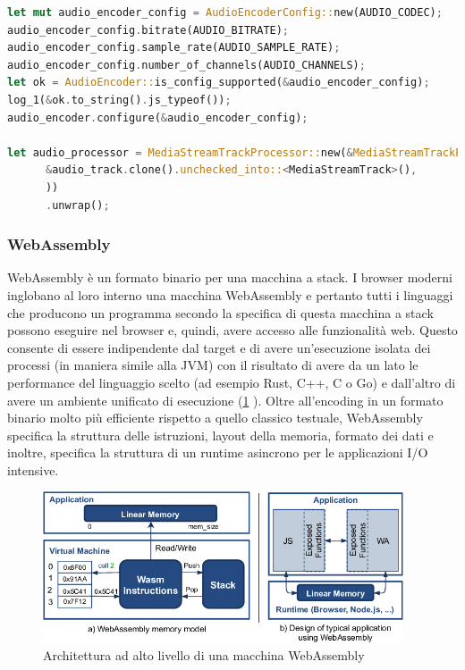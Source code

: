 \documentclass{article}
\begin{document}
\begin{lstlisting}[language=Rust, style=boxed, label={lst:audio-encoder-example}, captionpos=b,caption={Accesso e configurazione di AudioEncoder}]
let mut audio_encoder_config = AudioEncoderConfig::new(AUDIO_CODEC);
audio_encoder_config.bitrate(AUDIO_BITRATE);
audio_encoder_config.sample_rate(AUDIO_SAMPLE_RATE);
audio_encoder_config.number_of_channels(AUDIO_CHANNELS);
let ok = AudioEncoder::is_config_supported(&audio_encoder_config);
log_1(&ok.to_string().js_typeof());
audio_encoder.configure(&audio_encoder_config);

let audio_processor = MediaStreamTrackProcessor::new(&MediaStreamTrackProcessorInit::new(
      &audio_track.clone().unchecked_into::<MediaStreamTrack>(),
      ))
      .unwrap();

\end{lstlisting}
\subsubsection{WebAssembly} \label{section:web-assembly}
WebAssembly \cite{rossberg2021webassembly} è un formato binario per una macchina a stack. I browser moderni inglobano al 
loro interno una macchina WebAssembly e pertanto tutti i linguaggi che producono un programma
secondo la specifica di questa macchina a stack possono eseguire nel browser e, quindi, avere
accesso alle funzionalità web. Questo consente di essere indipendente dal target e di avere 
un'esecuzione isolata dei processi (in maniera simile alla JVM) con il risultato di avere 
da un lato le performance del linguaggio scelto (ad esempio Rust, C++, C o Go) e dall'altro di 
avere un ambiente unificato di esecuzione (\cref{fig:web-assembly-arch}
). Oltre all'encoding in un formato binario molto 
più efficiente rispetto a quello classico testuale, WebAssembly specifica la struttura delle
istruzioni, layout della memoria, formato dei dati e inoltre, specifica la struttura di 
un runtime asincrono per le applicazioni I/O intensive.

\begin{figure}
  \begin{center}
    \includegraphics[width=0.95\textwidth]{figures/WebAssembly-high-level-architecture.png}
  \end{center}
  \caption{Architettura ad alto livello di una macchina WebAssembly}\label{fig:web-assembly-arch}
\end{figure}
\end{document}

